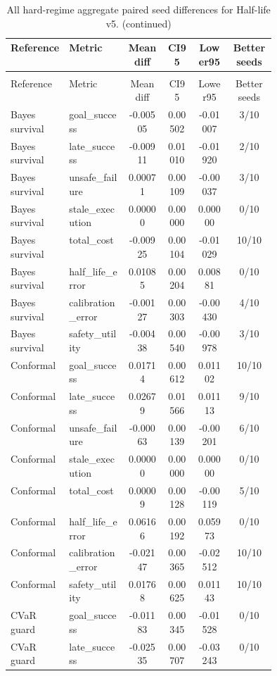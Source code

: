 \documentclass{article}
\begin{document}
\begin{center}
\scriptsize
\begin{longtable}{p{0.22\linewidth}p{0.22\linewidth}cccc}
\caption{All hard-regime aggregate paired seed differences for Half-life v5.}\label{tab:full-pairwise}\\
\toprule
Reference & Metric & Mean diff & CI95 & Lower95 & Better seeds\\
\midrule
\endfirsthead
\caption[]{All hard-regime aggregate paired seed differences for Half-life v5. (continued)}\\
\toprule
Reference & Metric & Mean diff & CI95 & Lower95 & Better seeds\\
\midrule
\endhead
Bayes survival & goal\_success & -0.00505 & 0.00502 & -0.01007 & 3/10\\
Bayes survival & late\_success & -0.00911 & 0.01010 & -0.01920 & 2/10\\
Bayes survival & unsafe\_failure & 0.00071 & 0.00109 & -0.00037 & 3/10\\
Bayes survival & stale\_execution & 0.00000 & 0.00000 & 0.00000 & 0/10\\
Bayes survival & total\_cost & -0.00925 & 0.00104 & -0.01029 & 10/10\\
Bayes survival & half\_life\_error & 0.01085 & 0.00204 & 0.00881 & 0/10\\
Bayes survival & calibration\_error & -0.00127 & 0.00303 & -0.00430 & 4/10\\
Bayes survival & safety\_utility & -0.00438 & 0.00540 & -0.00978 & 3/10\\
Conformal & goal\_success & 0.01714 & 0.00612 & 0.01102 & 10/10\\
Conformal & late\_success & 0.02679 & 0.01566 & 0.01113 & 9/10\\
Conformal & unsafe\_failure & -0.00063 & 0.00139 & -0.00201 & 6/10\\
Conformal & stale\_execution & 0.00000 & 0.00000 & 0.00000 & 0/10\\
Conformal & total\_cost & 0.00009 & 0.00128 & -0.00119 & 5/10\\
Conformal & half\_life\_error & 0.06166 & 0.00192 & 0.05973 & 0/10\\
Conformal & calibration\_error & -0.02147 & 0.00365 & -0.02512 & 10/10\\
Conformal & safety\_utility & 0.01768 & 0.00625 & 0.01143 & 10/10\\
CVaR guard & goal\_success & -0.01183 & 0.00345 & -0.01528 & 0/10\\
CVaR guard & late\_success & -0.02535 & 0.00707 & -0.03243 & 0/10\\

\end{longtable}
\end{center}
\end{document}

